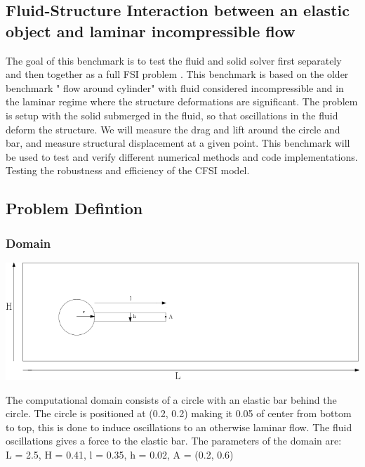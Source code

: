 \subsection{Fluid-Structure Interaction between an elastic object and laminar incompressible flow} \label{sec:HronTurek}
The goal of this benchmark is to test the fluid and solid solver first separately and then together as a full FSI problem \cite{Hron2006a}. This benchmark is based on the older benchmark " flow around cylinder" with fluid considered incompressible and in the laminar regime where the structure deformations are significant. The problem is setup with the solid submerged in the fluid, so that oscillations in the fluid deform the structure. We will measure the drag and lift around the circle and bar, and measure structural displacement at a given point. This benchmark will be used to test and verify different numerical methods and code implementations. Testing the robustness and efficiency of the CFSI model.


\subsection*{Problem Defintion}
\subsubsection*{Domain}

\begin{center}
\includegraphics[scale=0.4]{./Verification_Validation/Hron_Turek/Domain_drawing.png}
\end{center}

The computational domain consists of a circle with an elastic bar behind the circle. The circle is positioned at (0.2, 0.2) making it 0.05 of center from bottom to top, this is done to induce oscillations to an otherwise laminar flow. The fluid oscillations gives a force to the elastic bar. The parameters of the domain are:\\
L = 2.5, H = 0.41, l = 0.35, h = 0.02, A = (0.2, 0.6) \\

